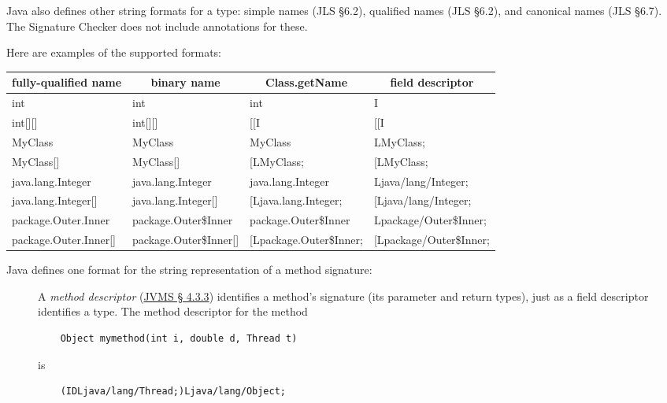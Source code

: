 Java also defines other string formats for a type: simple
names (JLS \S 6.2), qualified names (JLS \S 6.2), and canonical
names (JLS \S 6.7).  The Signature Checker does not include annotations
for these.

Here are examples of the supported formats:

\begin{center}
\begin{tabular}{|l|l|l|l|}
\hline
\multicolumn{1}{|c|}{fully-qualified name} & \multicolumn{1}{c|}{binary name} & \multicolumn{1}{c|}{Class.getName} & \multicolumn{1}{c|}{field descriptor} \\ \hline
int &                   int &                    int &                     I \\
int[][] &               int[][] &                [[I &                     [[I \\
MyClass &               MyClass &                MyClass &                 LMyClass; \\
MyClass[] &             MyClass[] &              [LMyClass; &              [LMyClass; \\
java.lang.Integer &     java.lang.Integer &      java.lang.Integer &       Ljava/lang/Integer; \\
java.lang.Integer[] &   java.lang.Integer[] &    [Ljava.lang.Integer; &    [Ljava/lang/Integer; \\
package.Outer.Inner &   package.Outer\$Inner &   package.Outer\$Inner &   Lpackage/Outer\$Inner; \\
package.Outer.Inner[] & package.Outer\$Inner[] & [Lpackage.Outer\$Inner; & [Lpackage/Outer\$Inner; \\
\hline
\end{tabular}
\end{center}

Java defines one format for the string representation of a method signature:

\begin{description}

\item[]
  A \emph{method descriptor} (\href{https://docs.oracle.com/javase/specs/jvms/se8/html/jvms-4.html#jvms-4.3.3}{JVMS \S
    4.3.3}) identifies a method's signature (its parameter and return
  types), just as a field descriptor identifies a
  type.   The method descriptor for the method
\begin{Verbatim}
    Object mymethod(int i, double d, Thread t)
\end{Verbatim}
\noindent is
\begin{Verbatim}
    (IDLjava/lang/Thread;)Ljava/lang/Object;
\end{Verbatim}

\end{description}


